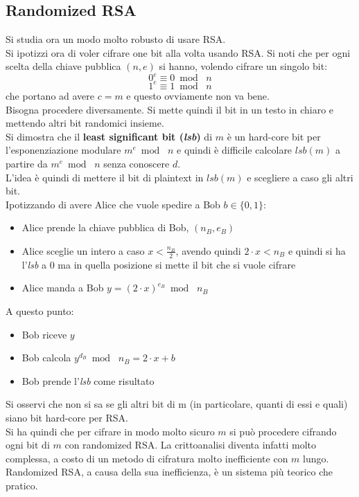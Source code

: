 \documentclass[a4paper,12pt, oneside]{book}
\begin{document}
\subsection{Randomized RSA}
Si studia ora un modo molto robusto di usare RSA.\\
Si ipotizzi ora di voler cifrare one bit alla volta usando RSA. Si noti che per
ogni scelta della chiave pubblica $(n,e)$ si hanno, volendo cifrare un singolo
bit: 
\[0^e\equiv 0\bmod\,\,n\]
\[1^e\equiv 1\bmod\,\,n\]
che portano ad avere $c=m$ e questo ovviamente non va bene.\\
Bisogna procedere diversamente. Si mette quindi il bit in un testo in chiaro e
mettendo altri bit randomici insieme.\\
Si dimostra che il \textbf{least significant bit (\textit{lsb})} di $m$
è un hard-core bit per l'esponenziazione modulare $m^e\bmod \,\,n$ e quindi è
difficile 
calcolare $lsb(m)$ a partire da  $m^e\bmod \,\,n$ senza conoscere $d$.\\
L'idea è quindi di mettere il bit di plaintext in $lsb(m)$ e scegliere a caso
gli altri bit.\\
Ipotizzando di avere Alice che vuole spedire a Bob $b\in\{0,1\}$:
\begin{itemize}
  \item Alice prende la chiave pubblica di Bob, $(n_B,e_B)$
  \item Alice sceglie un intero a caso $x<\frac{n_B}{2}$, avendo quindi $2\cdot
  x<n_B$ e quindi si ha l'\textit{lsb} a 0 ma in quella posizione si mette il
  bit che si vuole cifrare
  \item Alice manda a Bob $y=(2\cdot x)^{e_B}\bmod\,\,n_B$
\end{itemize}
A questo punto:
\begin{itemize}
  \item Bob riceve $y$
  \item Bob calcola $y^{d_B}\bmod\,\,n_B=2\cdot x+b$
  \item Bob prende l'\textit{lsb} come risultato
\end{itemize}
Si osservi che non si sa se gli altri bit di m (in particolare, quanti di essi e
quali) siano bit hard-core per RSA.\\
Si ha quindi che per cifrare in modo molto sicuro $m$ si può procedere cifrando
ogni bit di $m$ con randomized RSA. La crittoanalisi diventa infatti molto
complessa, a costo di un metodo di cifratura molto inefficiente con $m$ lungo.\\
Randomized RSA, a causa della sua inefficienza, è un sistema più teorico che
pratico. 
\end{document}
